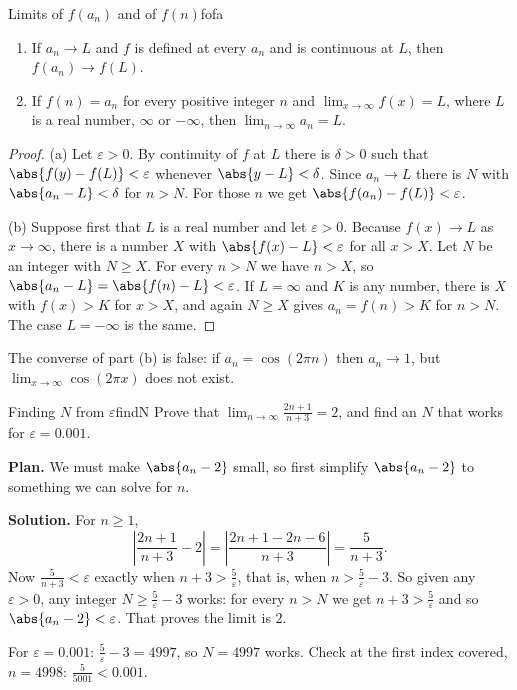 \documentclass[11pt]{article}
\begin{document}
\begin{thm}{Limits of $f(a_n)$ and of $f(n)$}{fofa}
\begin{enumerate}[label=(\alph*)]
  \item If $a_n\to L$ and $f$ is defined at every $a_n$ and is continuous at $L$, then $f(a_n)\to f(L)$.
  \item If $f(n)=a_n$ for every positive integer $n$ and $\lim_{x\to\infty}f(x)=L$, where $L$ is a real number, $\infty$ or $-\infty$, then $\lim_{n\to\infty}a_n=L$.
\end{enumerate}
\end{thm}
\begin{proof}
(a) Let $\varepsilon>0$. By continuity of $f$ at $L$ there is $\delta>0$ such that $\abs{f(y)-f(L)}<\varepsilon$ whenever $\abs{y-L}<\delta$. Since $a_n\to L$ there is $N$ with $\abs{a_n-L}<\delta$ for $n>N$. For those $n$ we get $\abs{f(a_n)-f(L)}<\varepsilon$.

(b) Suppose first that $L$ is a real number and let $\varepsilon>0$. Because $f(x)\to L$ as $x\to\infty$, there is a number $X$ with $\abs{f(x)-L}<\varepsilon$ for all $x>X$. Let $N$ be an integer with $N\ge X$. For every $n>N$ we have $n>X$, so $\abs{a_n-L}=\abs{f(n)-L}<\varepsilon$. If $L=\infty$ and $K$ is any number, there is $X$ with $f(x)>K$ for $x>X$, and again $N\ge X$ gives $a_n=f(n)>K$ for $n>N$. The case $L=-\infty$ is the same.
\end{proof}

The converse of part (b) is false: if $a_n=\cos(2\pi n)$ then $a_n\to1$, but $\lim_{x\to\infty}\cos(2\pi x)$ does not exist.

\begin{exmp}{Finding $N$ from $\varepsilon$}{findN}
Prove that $\displaystyle\lim_{n\to\infty}\frac{2n+1}{n+3}=2$, and find an $N$ that works for $\varepsilon=0.001$.

\textbf{Plan.} We must make $\abs{a_n-2}$ small, so first simplify $\abs{a_n-2}$ to something we can solve for $n$.

\textbf{Solution.} For $n\ge1$,
\[
\left|\frac{2n+1}{n+3}-2\right|=\left|\frac{2n+1-2n-6}{n+3}\right|=\frac{5}{n+3}.
\]
Now $\frac5{n+3}<\varepsilon$ exactly when $n+3>\frac5\varepsilon$, that is, when $n>\frac5\varepsilon-3$. So given any $\varepsilon>0$, any integer $N\ge\frac5\varepsilon-3$ works: for every $n>N$ we get $n+3>\frac5\varepsilon$ and so $\abs{a_n-2}<\varepsilon$. That proves the limit is $2$.

For $\varepsilon=0.001$: $\frac5\varepsilon-3=4997$, so $N=4997$ works. Check at the first index covered, $n=4998$: $\frac{5}{5001}<0.001$.
\end{exmp}
\end{document}
